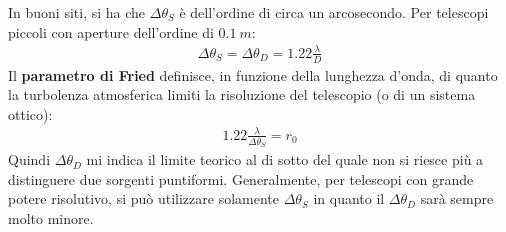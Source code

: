 \documentclass[a4paper, oneside]{book}
\begin{document}
In buoni siti, si ha che $\Delta \theta_S$ è dell'ordine di circa un arcosecondo. Per telescopi
piccoli con aperture dell'ordine di $0.1 \ m$:
\begin{gather*}
    \Delta \theta_S = \Delta\theta_D = 1.22 \frac{\lambda}{D}
\end{gather*}
Il \textbf{parametro di Fried} definisce, in funzione
della lunghezza d'onda, di quanto la turbolenza atmosferica limiti
la risoluzione del telescopio (o di un sistema ottico):
\begin{align}
    1.22 \frac{\lambda}{\Delta \theta_S} = r_0
\end{align}
Quindi $\Delta\theta_D$ mi indica il limite teorico al di sotto del quale
non si riesce più a distinguere due sorgenti puntiformi. Generalmente, per telescopi con
grande potere risolutivo, si può utilizzare solamente $\Delta \theta_S$ in quanto
il $\Delta \theta_D$ sarà sempre molto minore.
\end{document}
